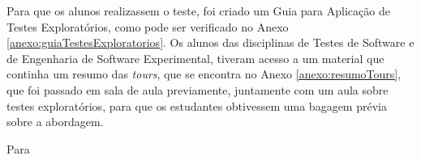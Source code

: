Para que os alunos realizassem o teste, foi criado um Guia para Aplicação de Testes Exploratórios, como pode ser verificado no Anexo \ref{anexo:guiaTestesExploratorios}. Os alunos das disciplinas de Testes de Software e de Engenharia de Software Experimental, tiveram acesso a um material que continha um resumo das \textit{tours}, que se encontra no Anexo \ref{anexo:resumoTours}, que foi passado em sala de aula previamente, juntamente com um aula sobre testes exploratórios, para que os estudantes obtivessem uma bagagem prévia sobre a abordagem. 

Para 